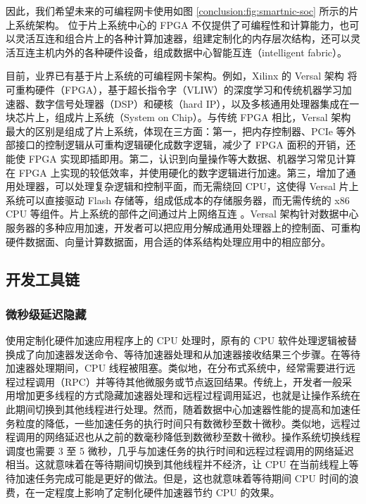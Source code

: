 因此，我们希望未来的可编程网卡使用如图 \ref{conclusion:fig:smartnic-soc} 所示的片上系统架构。
位于片上系统中心的 FPGA 不仅提供了可编程性和计算能力，也可以灵活互连和组合片上的各种计算加速器，组建定制化的内存层次结构，还可以灵活互连主机内外的各种硬件设备，组成数据中心智能互连（intelligent fabric）。

目前，业界已有基于片上系统的可编程网卡架构。例如，Xilinx 的 Versal 架构 \cite{vissers2018keynote,vissers2019versal,gaide2019xilinx} 将可重构硬件（FPGA），基于超长指令字（VLIW）的深度学习和传统机器学习加速器、数字信号处理器（DSP）和硬核（hard IP），以及多核通用处理器集成在一块芯片上，组成片上系统（System on Chip）。与传统 FPGA 相比，Versal 架构最大的区别是组成了片上系统，体现在三方面：第一，把内存控制器、PCIe 等外部接口的控制逻辑从可重构逻辑硬化成数字逻辑，减少了 FPGA 面积的开销，还能使 FPGA 实现即插即用。第二，认识到向量操作等大数据、机器学习常见计算在 FPGA 上实现的较低效率，并使用硬化的数字逻辑进行加速。第三，增加了通用处理器，可以处理复杂逻辑和控制平面，而无需绕回 CPU，这使得 Versal 片上系统可以直接驱动 Flash 存储等，组成低成本的存储服务器，而无需传统的 x86 CPU 等组件。片上系统的部件之间通过片上网络互连 \cite{swarbrick2019network,gaide2019xilinx}。Versal 架构针对数据中心服务器的多种应用加速，开发者可以把应用分解成通用处理器上的控制面、可重构硬件数据面、向量计算数据面，用合适的体系结构处理应用中的相应部分。



\subsection{开发工具链}
\label{future:toolchain}

\subsubsection{微秒级延迟隐藏}
\label{future:latency-hiding}

使用定制化硬件加速应用程序上的 CPU 处理时，原有的 CPU 软件处理逻辑被替换成了向加速器发送命令、等待加速器处理和从加速器接收结果三个步骤。在等待加速器处理期间，CPU 线程被阻塞。类似地，在分布式系统中，经常需要进行远程过程调用（RPC）并等待其他微服务或节点返回结果。传统上，开发者一般采用增加更多线程的方式隐藏加速器处理和远程过程调用延迟，也就是让操作系统在此期间切换到其他线程进行处理。然而，随着数据中心加速器性能的提高和加速任务粒度的降低，一些加速任务的执行时间只有数微秒至数十微秒。类似地，远程过程调用的网络延迟也从之前的数毫秒降低到数微秒至数十微秒。操作系统切换线程调度也需要 3 至 5 微秒，几乎与加速任务的执行时间和远程过程调用的网络延迟相当。这就意味着在等待期间切换到其他线程并不经济，让 CPU 在当前线程上等待加速任务完成可能是更好的做法。但是，这也就意味着等待期间 CPU 时间的浪费，在一定程度上影响了定制化硬件加速器节约 CPU 的效果。

